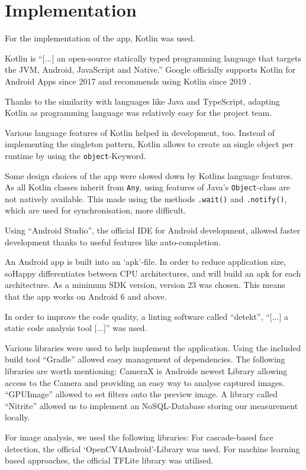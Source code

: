\section{Implementation} \label{sec:implementation}

For the implementation of the app, Kotlin was used.

Kotlin is ``[...] an open-source statically typed programming language
that targets the JVM, Android, JavaScript and Native.'' \cite{kotlin2020}
Google officially supports Kotlin for Android Apps since 2017
\cite{googleio2017} and recommends using Kotlin since 2019
\cite{androidkotlin2019}.

Thanks to the similarity with languages like Java and TypeScript, adapting
Kotlin as programming language was relatively easy for the project team.

Various language features of Kotlin helped in development, too. Instead of
implementing the singleton pattern, Kotlin allows to create an single object
per runtime by using the \texttt{object}-Keyword.

Some design choices of the app were slowed down by Kotlins language features.
As all Kotlin classes inherit from \texttt{Any}, using features of Java's 
\texttt{Object}-class are not natively available. This made using the methods
\texttt{.wait()} and \texttt{.notify()}, which are used for synchronisation,
more difficult.

Using ``Android Studio'', the official IDE for Android development, allowed
faster development thanks to useful features like auto-completion. 

An Android app is built into an `apk'-file. In order to reduce application
size, soHappy differentiates between CPU architectures, and will
build an apk for each architecture. As a minimum SDK version, version 23
was chosen. This means that the app works on Android 6 and above.

In order to improve the code quality, a linting software called ``detekt'',
``[...] a static code analysis tool [...]''\cite{detekt2020} was used.

Various libraries were used to help implement the application. Using
the included build tool ``Gradle'' allowed easy management of dependencies.
The following libraries are worth mentioning: CameraX is Androids newest
Library allowing access to the Camera and providing an easy way to analyse 
captured images. ``GPUImage'' allowed to set filters onto the preview 
image. A library called ``Nitrite'' allowed us to implement an NoSQL-Database 
storing our measurement locally.

For image analysis, we used the following libraries: For cascade-based face
detection, the official `OpenCV4Android'-Library was used. For machine learning
based approaches, the official TFLite library was utilised.


